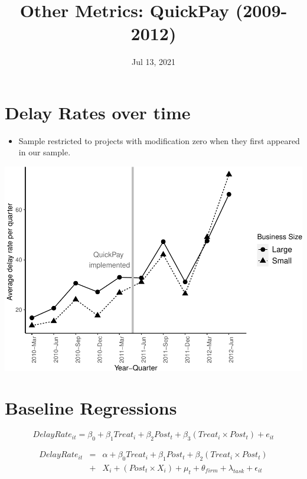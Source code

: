 \documentclass[
]{article}
\title{Other Metrics: QuickPay (2009-2012)}
\author{}
\date{\vspace{-2.5em}Jul 13, 2021}
\providecommand{\tightlist}{%
  \setlength{\itemsep}{0pt}\setlength{\parskip}{0pt}}
\begin{document}
\maketitle

\hypertarget{delay-rates-over-time}{%
\section{Delay Rates over time}\label{delay-rates-over-time}}

\begin{itemize}
\tightlist
\item
  Sample restricted to projects with modification zero when they first
  appeared in our sample.
\end{itemize}

\includegraphics{qp_first_delay_files/figure-latex/plot_relative_delay-1.pdf}

\hypertarget{baseline-regressions}{%
\section{Baseline Regressions}\label{baseline-regressions}}

\[ DelayRate_{it} = \beta_0 + \beta_1 Treat_i + \beta_2 Post_t + \beta_3 (Treat_i \times Post_t) + e_{it}\]

\[ \begin{aligned} DelayRate_{it} &=& \alpha+\beta_0 Treat_i + \beta_1 Post_t + \beta_2 (Treat_i \times Post_t)\\
&+&  X_i + (Post_t \times X_i) + \mu_t + \theta_{firm} + \lambda_{task}+ \epsilon_{it}
\end{aligned}\]
\end{document}
